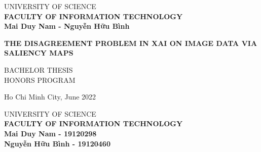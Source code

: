 \begin{titlepage}

\begin{center}
UNIVERSITY OF SCIENCE\\
\textbf{FACULTY OF INFORMATION TECHNOLOGY}\\[2cm]


{ \Large \bfseries Mai Duy Nam - Nguyễn Hữu Bình\\[2cm] } 


{ \Large \bfseries THE DISAGREEMENT PROBLEM IN XAI ON IMAGE DATA VIA SALIENCY MAPS\\[3cm]} 


\large BACHELOR THESIS\\
\large HONORS PROGRAM\\



\vfill
Ho Chi Minh City, June 2022

\end{center}

\pagebreak



\begin{center}

UNIVERSITY OF SCIENCE\\
\textbf{FACULTY OF INFORMATION TECHNOLOGY}\\[2cm]


{\large \bfseries Mai Duy Nam - 19120298\\} 
{\large \bfseries Nguyễn Hữu Bình - 19120460\\[2cm]}



\end{center}
\end{titlepage}
